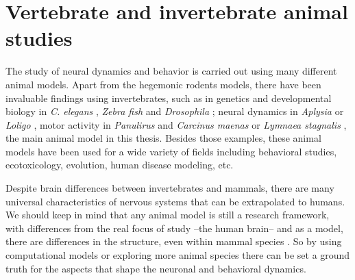 
\section{Vertebrate and invertebrate animal studies}
\label{c-intro-invertebrates}
The study of neural dynamics and behavior is carried out using many different animal models. Apart from the hegemonic rodents models, there have been invaluable findings using invertebrates, such as in genetics and developmental biology in \textit{C. elegans} \parencite{brenner_genetics_1974}, \textit{Zebra fish} \parencite{streisinger_production_1981} and \textit{Drosophila} \parencite{nusslein-volhard_mutations_1980}; neural dynamics in \textit{Aplysia} \parencite{wachtel_direct_1967} or \textit{Loligo} \parencite{HODGKIN1952}, motor activity in \textit{Panulirus} \parencite{SELVERSTON1976} and \textit{Carcinus maenas} \parencite{eisen_mechanisms_1982} or \textit{Lymnaea stagnalis} \parencite{Benjamin1979b}, the main animal model in this thesis. Besides those examples, these animal models have been used for a wide variety of fields including behavioral studies, ecotoxicology, evolution, human disease modeling, etc. \parencite{romanova_animal_2018} 

Despite brain differences between invertebrates and mammals, there are many universal characteristics of nervous systems that can be extrapolated to humans. We should keep in mind that any animal model is still a research framework, with differences from the real focus of study --the human brain-- and as a model, there are differences in the structure, even within mammal species \parencite{preuss_taking_2000}. So by using computational models or exploring more animal species there can be set a ground truth for the aspects that shape the neuronal and behavioral dynamics. 


